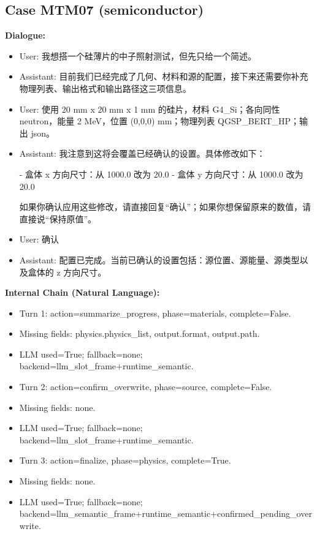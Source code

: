 \documentclass[11pt]{ctexart}
\begin{document}
\subsection{Case MTM07 (semiconductor)}
\textbf{Dialogue:}
\begin{itemize}
\item User: 我想搭一个硅薄片的中子照射测试，但先只给一个简述。
\item Assistant: 目前我们已经完成了几何、材料和源的配置，接下来还需要你补充物理列表、输出格式和输出路径这三项信息。
\item User: 使用 20 mm x 20 mm x 1 mm 的硅片，材料 G4\_Si；各向同性 neutron，能量 2 MeV，位置 (0,0,0) mm；物理列表 QGSP\_BERT\_HP；输出 json。
\item Assistant: 我注意到这将会覆盖已经确认的设置。具体修改如下：

- 盒体 x 方向尺寸：从 1000.0 改为 20.0
- 盒体 y 方向尺寸：从 1000.0 改为 20.0

如果你确认应用这些修改，请直接回复“确认”；如果你想保留原来的数值，请直接说“保持原值”。
\item User: 确认
\item Assistant: 配置已完成。当前已确认的设置包括：源位置、源能量、源类型以及盒体的 z 方向尺寸。
\end{itemize}
\textbf{Internal Chain (Natural Language):}
\begin{itemize}
\item Turn 1: action=summarize\_progress, phase=materials, complete=False.
\item Missing fields: physics.physics\_list, output.format, output.path.
\item LLM used=True; fallback=none; backend=llm\_slot\_frame+runtime\_semantic.
\item Turn 2: action=confirm\_overwrite, phase=source, complete=False.
\item Missing fields: none.
\item LLM used=True; fallback=none; backend=llm\_slot\_frame+runtime\_semantic.
\item Turn 3: action=finalize, phase=physics, complete=True.
\item Missing fields: none.
\item LLM used=True; fallback=none; backend=llm\_semantic\_frame+runtime\_semantic+confirmed\_pending\_overwrite.
\end{itemize}
\end{document}
